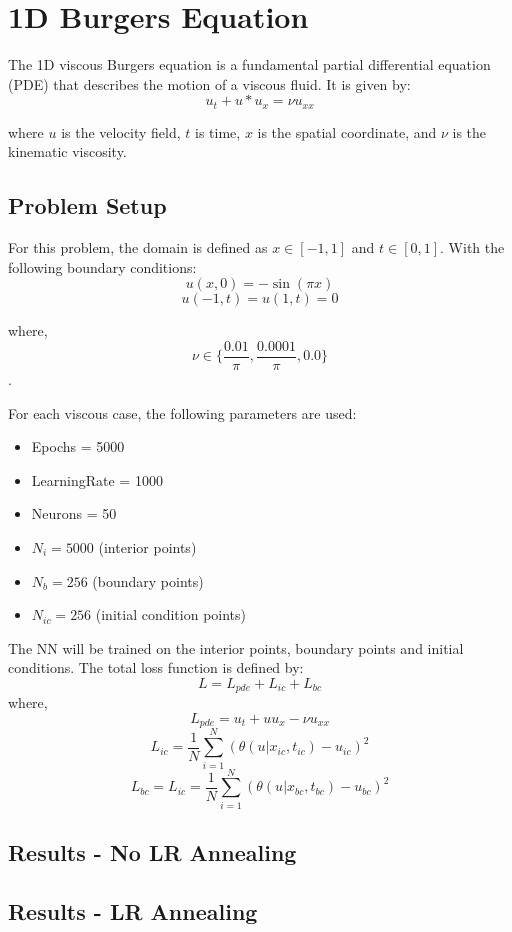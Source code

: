 \documentclass[11pt]{article}
\begin{document}
\section{1D Burgers Equation}
The 1D viscous Burgers equation is a fundamental partial differential equation (PDE) that describes the motion of a viscous fluid. It is given by:
\begin{equation}
    u_t + u*u_x = \nu u_{xx}
\end{equation}

where $u$ is the velocity field, $t$ is time, $x$ is the spatial coordinate, and $\nu$ is the kinematic viscosity.

\subsection{Problem Setup}
For this problem, the domain is defined as $x \in [-1, 1]$ and $t \in [0, 1]$. With the following boundary conditions:
\begin{equation}
    u(x, 0) = -\sin(\pi x)
\end{equation}
\begin{equation}
    u(-1, t) = u(1,t) = 0
\end{equation}
 
where,
\[
\nu \in \lbrace \frac{0.01}{\pi}, \frac{0.0001}{\pi}, 0.0 \rbrace
\].

For each viscous case, the following parameters are used:
\begin{itemize}
    \item Epochs = 5000
    \item LearningRate = 1000
    \item Neurons = 50
    \item $N_{i}  = 5000$ (interior points)
    \item $N_{b}  = 256$  (boundary points)
    \item $N_{ic} = 256$  (initial condition points)
\end{itemize}

The NN will be trained on the interior points, boundary points and initial conditions. The total loss function is defined by:
\begin{equation}
    L = L_{pde} + L_{ic} + L_{bc}
\end{equation}
where,
\begin{equation}
    L_{pde} = u_t + u u_x - \nu u_{xx}
\end{equation}
\begin{equation}
    L_{ic} = \frac{1}{N} \sum_{i=1}^{N} (\theta(u|x_{ic}, t_{ic})-u_{ic})^2
\end{equation}
\begin{equation}
    L_{bc} = L_{ic} = \frac{1}{N} \sum_{i=1}^{N} (\theta(u|x_{bc}, t_{bc})-u_{bc})^2
\end{equation}

\subsection{Results - No LR Annealing}



\subsection{Results - LR Annealing}
\end{document}
